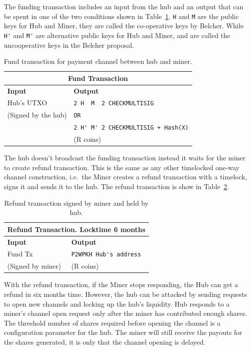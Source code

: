 \documentclass{article}
\begin{document}
The funding transaction includes an input from the hub and an output
that can be spent in one of the two conditions shown in
Table~\ref{fund-tx}. \verb|H| and \verb|M| are the public keys for Hub
and Miner, they are called the co-operative keys by Belcher. While
\verb|H'| and \verb|M'| are alternative public keys for Hub and Miner,
and are called the uncooperative keys in the Belcher proposal.


\begin{table}
  \centering
  \begin{tabular}{ ll }
    \multicolumn{2}{c}{\bfseries Fund Transaction} \\
    \midrule
    \bfseries Input & \bfseries Output \\
    \midrule
    Hub's UTXO & \verb|2 H  M  2 CHECKMULTISIG| \\
    (Signed by the hub) & \verb|OR| \\
                    & \verb|2 H' M' 2 CHECKMULTISIG + Hash(X)| \\
    & (R coins) \\
    \midrule
  \end{tabular}
  \caption{Fund transaction for payment channel between hub and miner.}\label{fund-tx}
\end{table}


The hub doesn't broadcast the funding transaction instead it waits for
the miner to create refund transaction. This is the same as any other
timelocked one-way channel construction, i.e.\ the Miner creates a
refund transaction with a timelock, signs it and sends it to the
hub. The refund transaction is show in Table~\ref{refund-tx}.

\begin{table}
  \centering
  \begin{tabular}{ ll }
    \multicolumn{2}{c}{\bfseries Refund Transaction. Locktime 6 months} \\
    \midrule
    \bfseries Input & \bfseries Output \\
    \midrule
    Fund Tx & \verb|P2WPKH Hub's address| \\
    (Signed by miner) & (R coins) \\
    \midrule
  \end{tabular}
  \caption{Refund transaction signed by miner and held by
    hub.}\label{refund-tx}
\end{table}

With the refund transaction, if the Miner stops responding, the Hub
can get a refund in six months time. However, the hub can be attacked
by sending requests to open new channels and locking up the hub's
liquidity. Hub responds to a miner's channel open request only after
the miner has contributed enough shares. The threshold number of
shares required before opening the channel is a configuration
parameter for the hub. The miner will still receive the payouts for
the shares generated, it is only that the channel opening is delayed.
\end{document}
